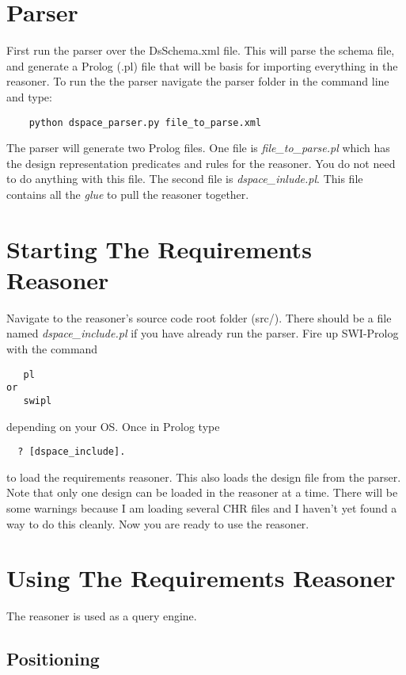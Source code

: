 \documentclass[12pt]{article}
\begin{document}
\maketitle

\section{Parser}
First run the parser over the DsSchema.xml file. This will parse the schema file, and generate a Prolog (.pl) file that will be basis for importing everything in the reasoner. To run the the parser navigate the parser folder in the command line and type:
\begin{verbatim}
    python dspace_parser.py file_to_parse.xml
\end{verbatim}
The parser will generate two Prolog files. One file is \emph{file_to_parse.pl} which has the design representation predicates and rules for the reasoner. You do not need to do anything with this file. The second file is \emph{dspace_inlude.pl}. This file contains all the \emph{glue} to pull the reasoner together.


\section{Starting The Requirements Reasoner}
Navigate to the reasoner's source code root folder (src/). There should be a file named \emph{dspace_include.pl} if you have already run the parser. Fire up SWI-Prolog with the command 
\begin{verbatim} 
   pl
or 
   swipl
\end{verbatim} depending on your OS. Once in Prolog type 
\begin{verbatim} 
  ? [dspace_include].
\end{verbatim} to load the requirements reasoner. This also loads the design file from the parser. Note that only one design can be loaded in the reasoner at a time. There will be some warnings because I am loading several CHR files and I haven't yet found a way to do this cleanly. Now you are ready to use the reasoner.

\section{Using The Requirements Reasoner}
The reasoner is used as a query engine.

\subsection{Positioning}
\end{document}
